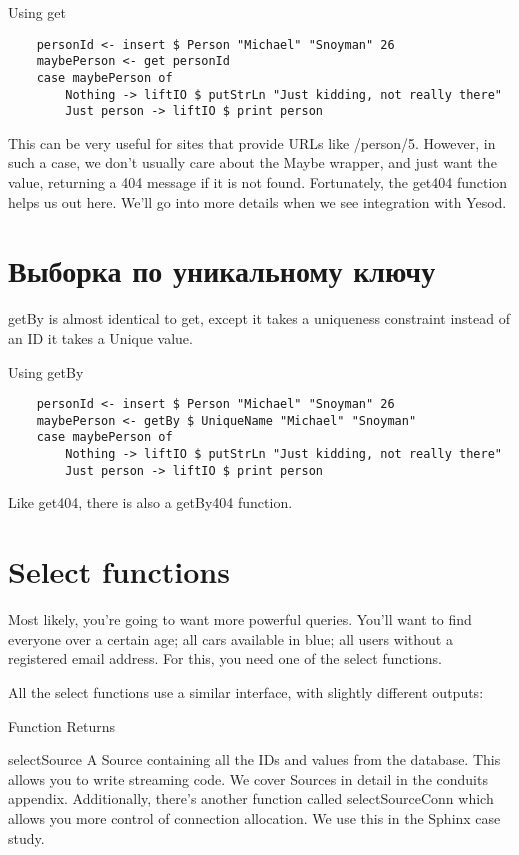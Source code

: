 Using get %

\begin{lstlisting}
    personId <- insert $ Person "Michael" "Snoyman" 26
    maybePerson <- get personId
    case maybePerson of
        Nothing -> liftIO $ putStrLn "Just kidding, not really there"
        Just person -> liftIO $ print person
\end{lstlisting}%

This can be very useful for sites that provide URLs like /person/5. However, in such a case, we don't usually care about the Maybe wrapper, and just want the value, returning a 404 message if it is not found. Fortunately, the get404 function helps us out here. We'll go into more details when we see integration with Yesod.

\section{Выборка по уникальному ключу} %

getBy is almost identical to get, except it takes a uniqueness constraint instead of an ID it takes a Unique value.

Using getBy %

\begin{lstlisting}
    personId <- insert $ Person "Michael" "Snoyman" 26
    maybePerson <- getBy $ UniqueName "Michael" "Snoyman"
    case maybePerson of
        Nothing -> liftIO $ putStrLn "Just kidding, not really there"
        Just person -> liftIO $ print person
\end{lstlisting}

Like get404, there is also a getBy404 function.

\section{Select functions}

Most likely, you're going to want more powerful queries. You'll want to find everyone over a certain age; all cars available in blue; all users without a registered email address. For this, you need one of the select functions.

All the select functions use a similar interface, with slightly different outputs:


Function	Returns

selectSource	A Source containing all the IDs and values from the database. This allows you to write streaming code.
                We cover Sources in detail in the conduits appendix. Additionally, there's another function called selectSourceConn which allows you more control of connection allocation. We use this in the Sphinx case study.

